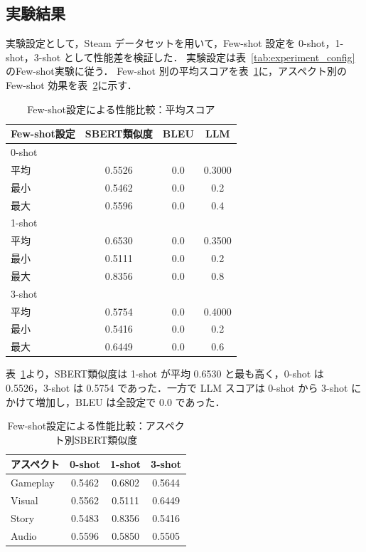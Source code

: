 \subsection{実験結果}
実験設定として，Steam データセットを用いて，Few-shot 設定を 0-shot，1-shot，3-shot として性能差を検証した．
実験設定は表~\ref{tab:experiment_config}のFew-shot実験に従う．
Few-shot 別の平均スコアを表~\ref{tab:fewshot_summary}に，アスペクト別の Few-shot 効果を表~\ref{tab:fewshot_aspect}に示す．
\begin{table}[htbp]
  \centering
  \caption{Few-shot設定による性能比較：平均スコア}
  \label{tab:fewshot_summary}
  \begin{tabular}{lccc}
    \toprule
    Few-shot設定 & SBERT類似度 & BLEU & LLM \\
    \midrule
    0-shot & & & \\
    \quad 平均 & 0.5526 & 0.0 & 0.3000 \\
    \quad 最小 & 0.5462 & 0.0 & 0.2 \\
    \quad 最大 & 0.5596 & 0.0 & 0.4 \\
    \midrule
    1-shot & & & \\
    \quad 平均 & 0.6530 & 0.0 & 0.3500 \\
    \quad 最小 & 0.5111 & 0.0 & 0.2 \\
    \quad 最大 & 0.8356 & 0.0 & 0.8 \\
    \midrule
    3-shot & & & \\
    \quad 平均 & 0.5754 & 0.0 & 0.4000 \\
    \quad 最小 & 0.5416 & 0.0 & 0.2 \\
    \quad 最大 & 0.6449 & 0.0 & 0.6 \\
    \bottomrule
  \end{tabular}
\end{table}

表~\ref{tab:fewshot_summary}より，SBERT類似度は 1-shot が平均 0.6530 と最も高く，0-shot は 0.5526，3-shot は 0.5754 であった．一方で LLM スコアは 0-shot から 3-shot にかけて増加し，BLEU は全設定で 0.0 であった．

\begin{table}[htbp]
  \centering
  \caption{Few-shot設定による性能比較：アスペクト別SBERT類似度}
  \label{tab:fewshot_aspect}
  \begin{tabular}{lccc}
    \toprule
    アスペクト & 0-shot & 1-shot & 3-shot \\
    \midrule
    Gameplay & 0.5462 & 0.6802 & 0.5644 \\
    Visual & 0.5562 & 0.5111 & 0.6449 \\
    Story & 0.5483 & 0.8356 & 0.5416 \\
    Audio & 0.5596 & 0.5850 & 0.5505 \\
    \bottomrule
  \end{tabular}
\end{table}

